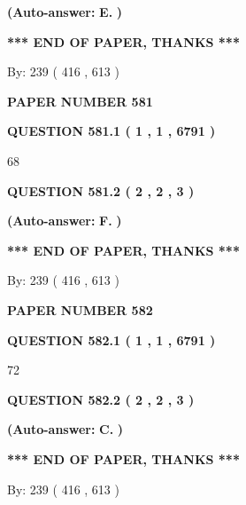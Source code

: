 \documentclass[12pt]{article}
\begin{document}
 
{\textbf{(Auto-answer:}}
{\textbf{\large{
E.}}}
{\textbf{)}}
 
 
   
   
   
   
\vspace{1.0in} 
{\textbf{\large{ *** END OF PAPER, THANKS *** }}} 
   
   
\hspace{1.0in} By: 
 239 ( 416 ,  613 )
   
   
   
   
\newpage 
\setcounter{page}{ 
   581001 } 
   
   
 {\textbf{ \Large{ PAPER NUMBER  581  }}}
   
   
   
   
  
  
{\textbf{\large{QUESTION
581.1 
 ( 1 , 1 , 6791 )
}}}

68
  
  
{\textbf{\large{QUESTION
581.2 
 ( 2 , 2 , 3 )
}}}
 
 
{\textbf{(Auto-answer:}}
{\textbf{\large{
F.}}}
{\textbf{)}}
 
 
   
   
   
   
\vspace{1.0in} 
{\textbf{\large{ *** END OF PAPER, THANKS *** }}} 
   
   
\hspace{1.0in} By: 
 239 ( 416 ,  613 )
   
   
   
   
\newpage 
\setcounter{page}{ 
   582001 } 
   
   
 {\textbf{ \Large{ PAPER NUMBER  582  }}}
   
   
   
   
  
  
{\textbf{\large{QUESTION
582.1 
 ( 1 , 1 , 6791 )
}}}

72
  
  
{\textbf{\large{QUESTION
582.2 
 ( 2 , 2 , 3 )
}}}
 
 
{\textbf{(Auto-answer:}}
{\textbf{\large{
C.}}}
{\textbf{)}}
 
 
   
   
   
   
\vspace{1.0in} 
{\textbf{\large{ *** END OF PAPER, THANKS *** }}} 
   
   
\hspace{1.0in} By: 
 239 ( 416 ,  613 )
   
   
   
\end{document}
